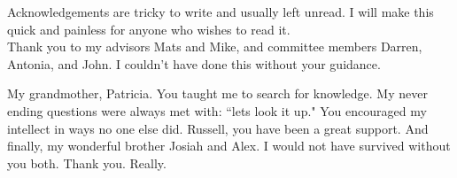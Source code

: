Acknowledgements are tricky to write and usually left unread. I will make this quick and painless for anyone who wishes to read it. \\

Thank you to my advisors Mats and Mike, and committee members Darren, Antonia, and John. I couldn't have done this without your guidance.

My grandmother, Patricia. You taught me to search for knowledge.  My never ending questions were always met with: ``lets look it up." You encouraged my intellect in ways no one else did. Russell, you have been a great support. And finally, my wonderful brother Josiah and Alex. I would not have survived without you both. Thank you. Really. 


